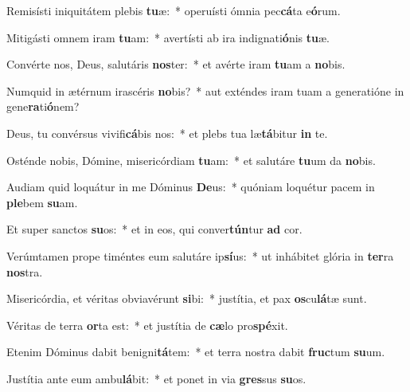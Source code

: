 \item Remisísti iniquitátem plebis \textbf{tu}æ:~* operuísti ómnia pec\textbf{cá}ta e\textbf{ó}rum.
\item Mitigásti omnem iram \textbf{tu}am:~* avertísti ab ira indignati\textbf{ó}nis \textbf{tu}æ.
\item Convérte nos, Deus, salutáris \textbf{nos}ter:~* et avérte iram \textbf{tu}am a \textbf{no}bis.
\item Numquid in ætérnum irascéris \textbf{no}bis?~* aut exténdes iram tuam a generatióne in gene\textbf{ra}ti\textbf{ó}nem?
\item Deus, tu convérsus vivifi\textbf{cá}bis nos:~* et plebs tua læ\textbf{tá}bitur \textbf{in} te.
\item Osténde nobis, Dómine, misericórdiam \textbf{tu}am:~* et salutáre \textbf{tu}um da \textbf{no}bis.
\item Audiam quid loquátur in me Dóminus \textbf{De}us:~* quóniam loquétur pacem in \textbf{ple}bem \textbf{su}am.
\item Et super sanctos \textbf{su}os:~* et in eos, qui conver\textbf{tún}tur \textbf{ad} cor.
\item Verúmtamen prope timéntes eum salutáre ip\textbf{sí}us:~* ut inhábitet glória in \textbf{ter}ra \textbf{nos}tra.
\item Misericórdia, et véritas obviavérunt \textbf{si}bi:~* justítia, et pax \textbf{os}cu\textbf{lá}tæ sunt.
\item Véritas de terra \textbf{or}ta est:~* et justítia de \textbf{cæ}lo pro\textbf{spé}xit.
\item Etenim Dóminus dabit benigni\textbf{tá}tem:~* et terra nostra dabit \textbf{fruc}tum \textbf{su}um.
\item Justítia ante eum ambu\textbf{lá}bit:~* et ponet in via \textbf{gres}sus \textbf{su}os.
